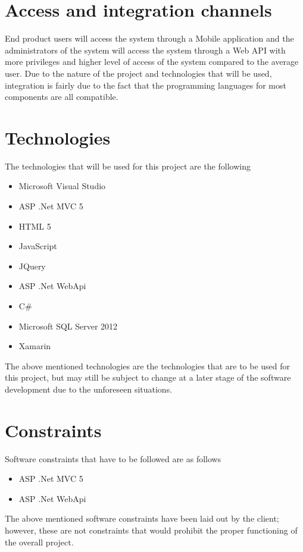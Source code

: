 \documentclass[11pt,titlepage]{article} %
\begin{document}
\section{Access and integration channels}
End product users will access the system through a Mobile application and the administrators of the system will access the system through a Web API with more privileges and higher level of access of the system compared to the average user. Due to the nature of the project and technologies that will be used, integration is fairly due to the fact that the programming languages for most components are all compatible.

\section{Technologies}
The technologies that will be used  for this project are the following
\begin{itemize}
	\item{Microsoft Visual Studio}
	\item{ASP .Net MVC 5}
	\item{HTML 5}
	\item{JavaScript}
	\item{JQuery}
	\item{ASP .Net WebApi}
	\item{C\#}
	\item{Microsoft SQL Server 2012}
	\item{Xamarin}
	\end{itemize}
The above mentioned technologies are the technologies that are to be used for this project, but may still be subject to change at a later stage of the software development due to the unforeseen situations. 



\section{Constraints}
Software constraints that have to be followed are as follows
\begin{itemize}
	\item{ASP .Net MVC 5}
	\item{ASP .Net WebApi}
\end{itemize}
The above mentioned software constraints have been laid out by the client; however, these are not constraints that would prohibit the proper functioning of the overall project.
\end{document}
